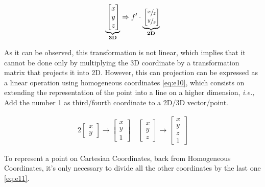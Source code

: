 \documentclass{article}
\begin{document}
\begin{alignat}{2}
\underbrace{\vphantom{\begin{bmatrix}n^2 \\ n^3 \end{bmatrix}}\begin{bmatrix}
x  \\
y  \\
z
\end{bmatrix}}_{\mathbf{3D}} \Rightarrow f' \cdot 
\underbrace{\vphantom{\begin{bmatrix}n^2 \\ n^3 \end{bmatrix}}\begin{bmatrix}
\sfrac{x}{z}  \\
\sfrac{y}{z}
\end{bmatrix}}_{\mathbf{2D}} \label{eq:e9}
\end{alignat}

As it can be observed, this transformation is not linear, which implies that it cannot be done only by multiplying the 3D coordinate by a transformation matrix that projects it into 2D. However, this can projection can be expressed as a linear operation using homogeneous coordinates \eqref{eq:e10}, which consists on extending the representation of the point into a line on a higher dimension, \textit{i.e.,} Add the number 1 as third/fourth coordinate to a 2D/3D vector/point. 

\begin{alignat}{2}
\begin{bmatrix}
x  \\
y
\end{bmatrix} \rightarrow
\begin{bmatrix}
x  \\
y  \\
1
\end{bmatrix} \quad
\begin{bmatrix}
x  \\
y  \\
z
\end{bmatrix} \rightarrow
\begin{bmatrix}
x  \\
y  \\
z  \\
1
\end{bmatrix} \label{eq:e10}
\end{alignat}


To represent a point on Cartesian Coordinates, back from Homogeneous Coordinates, it's only necessary to divide all the other coordinates by the last one \eqref{eq:e11}.
\end{document}
